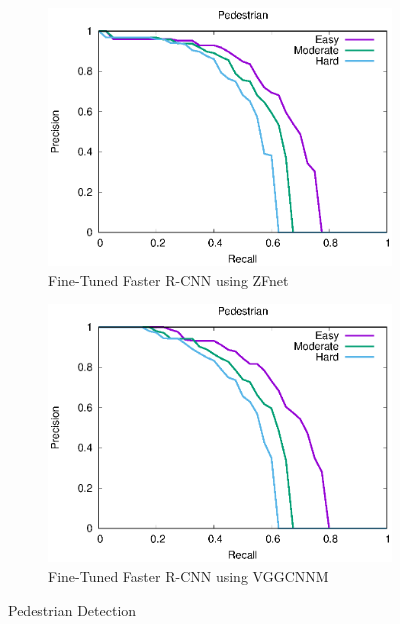 \begin{figure}[H]
\begin{subfigure}[t]{.32\textwidth}
    \includegraphics[width=1.0\linewidth]{img/FRCNN_Dec_7_tiny/plot_valid_30/pedestrian_detection.eps}
    \caption{Fine-Tuned Faster R-CNN using ZFnet}
\end{subfigure}%
\begin{subfigure}[t]{.32\textwidth}
    \centering
    \includegraphics[width=1.0\linewidth]{img/FRCNN_Dec_7_mid/plot_valid_30/pedestrian_detection.eps}
    \caption{Fine-Tuned Faster R-CNN using VGG\textunderscore CNN\textunderscore M }
\end{subfigure}
\caption{Pedestrian Detection}
\end{figure}

